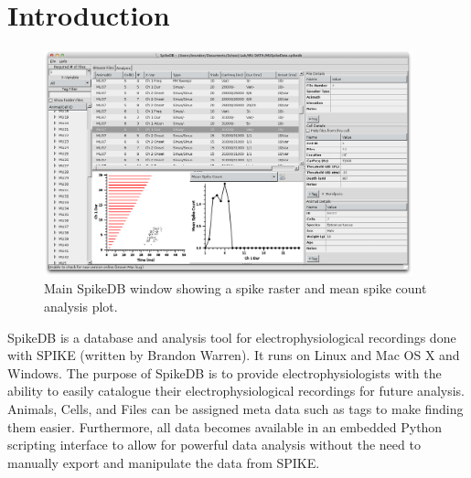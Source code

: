 \documentclass{report}
\begin{document}
\chapter{Introduction}
\begin{figure}[h]
\begin{center}
	\includegraphics[width=0.95\textwidth]{main_window.png}
\end{center}
\caption{Main SpikeDB window showing a spike raster and mean spike count analysis plot.}
\end{figure}
SpikeDB is a database and analysis tool for electrophysiological recordings done with SPIKE (written by Brandon Warren). It runs on Linux and Mac OS X and Windows. The purpose of SpikeDB is to provide electrophysiologists with the ability to easily catalogue their electrophysiological recordings for future analysis. Animals, Cells, and Files can be assigned meta data such as tags to make finding them easier. Furthermore, all data becomes available in an embedded Python scripting interface to allow for powerful data analysis without the need to manually export and manipulate the data from SPIKE.


\clearpage
\end{document}
